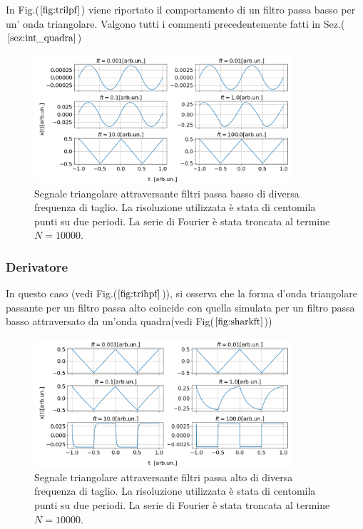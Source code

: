 \documentclass{article}
\begin{document}
            In Fig.($\ref{fig:trilpf}$) viene riportato il comportamento di un filtro passa
            basso per un' onda triangolare. Valgono tutti i commenti precedentemente fatti in 
            Sez.($\ref{sez:int_quadra}$)
            \begin{figure}[H]
                \centering
                \includegraphics[width=0.85\textwidth]{integ_trian.png} %
                \caption{Segnale triangolare attraversante filtri passa basso di diversa frequenza di taglio.
                La risoluzione utilizzata è stata di centomila punti su due periodi.
                La serie di Fourier è stata troncata al termine $N=10000$.}
                \label{fig:trilpf}
            \end{figure}
        \subsubsection{Derivatore}
            In questo caso (vedi Fig.($\ref{fig:trihpf}$)), si osserva che la forma d'onda 
            triangolare passante per un filtro passa alto coincide con quella simulata 
            per un filtro passa basso attraversato da un'onda quadra(vedi Fig($\ref{fig:sharkft}$))
                \begin{figure}[H]
                    \centering
                    \includegraphics[width=0.85\textwidth]{der_trian.png} %
                    \caption{
                    Segnale triangolare attraversante filtri passa alto di diversa frequenza di taglio.
                    La risoluzione utilizzata è stata di centomila punti su due periodi.
                    La serie di Fourier è stata troncata al termine $N=10000$.}
                    \label{fig:trihpf}
                \end{figure}
\end{document}
